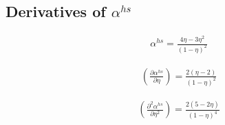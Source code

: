 \documentclass[internal,english]{sintefmemo2012}
\newcommand*{\pder}[2]{\left(\frac{\partial #1}{\partial #2}\right)}
\newcommand*{\pdder}[2]{\left(\frac{\partial^2 #1}{\partial #2^2}\right)}
\newcommand*{\pdcross}[3]{\left(\frac{\partial^2 #1}{\partial #2 \partial #3}\right)}
\newcommand{\z}{\zeta}
\newcommand{\lp}{\left(}
\newcommand{\rp}{\right)}
\begin{document}
\subsection{Derivatives of $\alpha^{hs}$}
\begin{align}
  \alpha^{hs} = \frac{4\eta-3\eta^2}{(1-\eta)^2}
\end{align}

\begin{align}
  \pder{\alpha^{hs}}{\eta} = \frac{2(\eta-2)}{(1-\eta)^2}
\end{align}

\begin{align}
  \pdder{\alpha^{hs}}{\eta} = \frac{2(5-2\eta)}{(1-\eta)^4}
\end{align}


\end{document}
